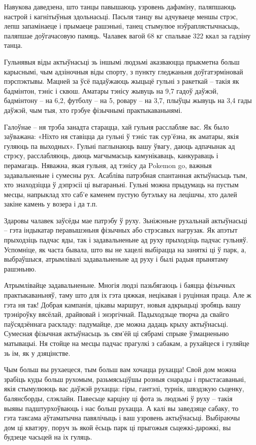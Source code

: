 Навукова даведзена, што танцы павышаюць узровень дафаміну, паляпшаюць настрой і кагнітыўныя здольнасьці. Пасьля танцу вы адчуваеце меншы стрэс, лепш запамінаеце і прымаеце рашэньні, танец стымулюе нэўраплястычнасьць, паляпшае доўгачасовую памяць. Чалавек вагой 68 кг спальвае 322 ккал за гадзіну танца.

Гульнявыя віды актыўнасьці зь іншымі людзьмі аказваюцца прыкметна больш карыснымі, чым адзіночныя віды спорту, з пункту гледжаньня доўгатэрміновай пэрспэктывы. Мацней за ўсё падаўжаюць жыцьцё гульні з ракеткай – такія як бадмінтон, тэніс і сквош. Аматары тэнісу жывуць на 9,7 гадоў даўжэй, бадмінтону – на 6,2, футболу – на 5, ровару – на 3,7, плыўцы жывуць на 3,4 гады даўжэй, чым тыя, хто грэбуе фізычнымі практыкаваньнямі.

Галоўнае – ня трэба занадта старацца, хай гульня расслабляе вас. Як было заўважана: «Ніхто ня ставіцца да гульні ў тэніс так сур'ёзна, як аматары, якія гуляюць па выходных». Гульні паглынаюць вашу ўвагу, даюць адпачынак ад стрэсу, расслабляюць, даюць магчымасьць камунікаваць, канкураваць і перамагаць. Няважна, якая гульня, ад тэнісу да Pokemon go, важныя задавальненьне і сумесны рух. Асабліва патрэбная спантанная актыўнасьць тым, хто знаходзіцца ў дэпрэсіі ці выгараньні. Гульні можна прыдумаць на пустым месцы, напрыклад хто саб'е каменем пустую бутэльку на лецішчы, хто далей закіне камень у возера і да т.п.

Здаровы чалавек заўсёды мае патрэбу ў руху. Зьніжэньне рухальнай актыўнасьці – гэта індыкатар перавышэньня фізычных або стрэсавых нагрузак. Як апэтыт прыходзіць падчас яды, так і задавальненьне ад руху прыходзіць падчас гульняў. Успомніце, як часта бывала, што вы не хацелі выбірацца на заняткі ці ў парк, а, выбраўшыся, атрымлівалі задавальненьне ад руху і былі радыя прынятаму рашэньню.

Атрымлівайце задавальненьне. Многія людзі пазьбягаюць і баяцца фізычных практыкаваньняў, таму што для іх гэта цяжкая, нецікавая і руцінная праца. Але ж гэта ня так! Добрая кампанія, цікавы маршрут, новыя адкрыцьці зробяць вашу трэніроўку вясёлай, драйвовай і энэргічнай. Падыходзьце творча да свайго паўсядзённага раскладу: падумайце, дзе можна дадаць крыху актыўнасьці. Сумесная фізычная актыўнасьць зь сям'ёй ці сябрамі спрыяе ўзмацненьню матывацыі. Ня стойце на месцы падчас прагулкі з сабакам, а рухайцеся і гуляйце зь ім, як у дзяцінстве.

Чым больш вы рухаецеся, тым больш вам хочацца рухацца! Свой дом можна зрабіць куды больш рухомым, разьмясьціўшы розныя снарады і прыстасаваньні, якія стымулююць вас даўжэй рухацца: гіры, гантэлі, турнік, швэдзкую сьценку, балянсборды, слэклайн. Павесьце карціну ці фота зь людзьмі ў руху – такія выявы падштурхоўваюць і нас больш рухацца. А калі вы заведзяце сабаку, то гэта таксама аўтаматычна павялічыць і ваш узровень актыўнасьці. Выбіраючы дом ці кватэру, поруч зь якой ёсьць парк ці прыгожыя сьцежкі-дарожкі, вы будзеце часьцей на іх гуляць.

